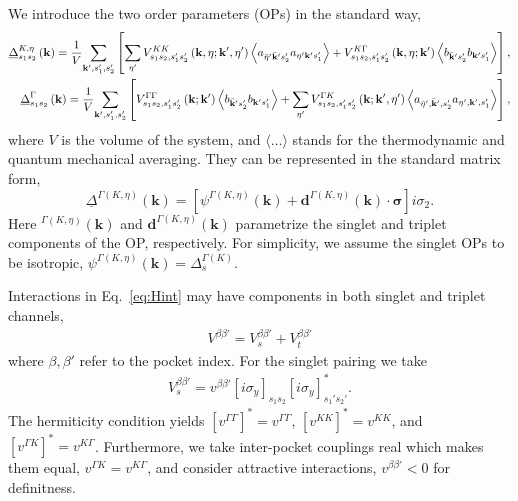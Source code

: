 \documentclass[showpacs,superscriptaddress,onecolumn,prb]{revtex4}
\begin{document}
We introduce the two order parameters (OPs) in the standard way, 
\begin{align}
\label{eq:OP}
\underline{\Delta}_{s_{1}s_{2}}^{K,\eta}\left(\mathbf{k}\right)=\frac{1}{V}\underset{\mathbf{k}',s_{1}',s_{2}'}{\sum}\left[\sum_{\eta'}V_{s_{1}s_{2},s_{1}'s_{2}'}^{KK}\left(\mathbf{k},\eta;\mathbf{k}',\eta'\right)\left\langle a_{\bar{\eta}'\bar{\mathbf{k}}'s_{2}'}a_{\eta'\mathbf{k}'s_{1}'}\right\rangle +V_{s_{1}s_{2},s_{1}'s_{2}'}^{K\Gamma}\left(\mathbf{k},\eta;\mathbf{k}'\right)\left\langle b_{\bar{\mathbf{k}}'s_{2}'}b_{\mathbf{k}'s_{1}'}\right\rangle \right],
\notag \\
\underline{\Delta}_{s_{1}s_{2}}^{\Gamma}\left(\mathbf{k}\right)=\frac{1}{V}\underset{\mathbf{k}',s_{1}',s_{2}'}{\sum}\left[V_{s_{1}s_{2},s_{1}'s_{2}'}^{\Gamma\Gamma}\left(\mathbf{k};\mathbf{k}'\right)\left\langle b_{\bar{\mathbf{k}}'s_{2}'}b_{\mathbf{k}'s_{1}'}\right\rangle +\sum_{\eta'}V_{s_{1}s_{2},s_{1}'s_{2}'}^{\Gamma K}\left(\mathbf{k};\mathbf{k}',\eta'\right)\left\langle a_{\bar{\eta}',\bar{\mathbf{k}}',s_{2}'}a_{\eta',\mathbf{k}',s_{1}'}\right\rangle \right], 
\end{align}
where $V$ is the volume of the system, and $\langle \ldots \rangle$ stands for the thermodynamic and quantum mechanical averaging.
They can be represented in the standard matrix form,
%
\begin{equation}
\underline{\Delta}^{\Gamma(K,\eta)}\left(\mathbf{k}\right)
=\left[\psi^{\Gamma(K,\eta)}\left(\mathbf{k}\right)+\mathbf{d}^{\Gamma(K,\eta)}\left(\mathbf{k}\right)\cdot\boldsymbol{\sigma}\right]i\sigma_{2}.\label{eq:1.8}
\end{equation}
Here $^{\Gamma(K,\eta)}\left(\mathbf{k}\right)$ and $\mathbf{d}^{\Gamma(K,\eta)}\left(\mathbf{k}\right)$
parametrize the singlet and triplet components of the OP, respectively.
For simplicity, we assume the singlet OPs to be isotropic,
$\psi^{\Gamma\left(K,\eta\right)}\left(\mathbf{k}\right)=\Delta_{s}^{\Gamma\left(K\right)}$. 


Interactions in Eq.~\eqref{eq:Hint} may have components in both singlet and triplet channels, 
\begin{align}
    V^{\beta\beta'}= V_{s}^{\beta\beta'} + V_{t}^{\beta\beta'}
\end{align}
where $\beta,\beta'$ refer to the pocket index. For the singlet pairing we take 
\begin{align}\label{eq:Vsinglet}
V_{s}^{\beta\beta'}=v^{\beta\beta'}\left[i\sigma_{y}\right]_{s_{1}s_{2}}\left[i\sigma_{y}\right]_{s_{1}'s_{2}'}^{*}.
\end{align}
The hermiticity condition yields $\left[v^{\Gamma \Gamma}\right]^* = v^{\Gamma \Gamma}$, $\left[v^{K K}\right]^* = v^{K K} $, and $\left[v^{\Gamma K}\right]^* = v^{K \Gamma}$.
Furthermore, we take inter-pocket couplings real which makes them equal,
$v^{\Gamma K} = v^{K \Gamma}$, and consider attractive interactions, $v^{\beta\beta'}< 0$ for definitness.
\end{document}
